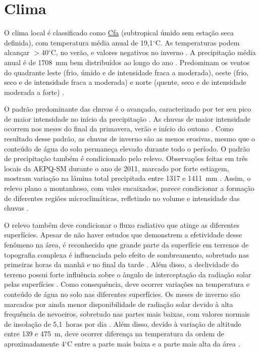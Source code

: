 \section{Clima}

O clima local é classificado como \href{http://pt.wikipedia.org/wiki/Clima_subtropical_\%C3\%BAmido}{Cfa} (subtropical úmido sem estação seca definida), com temperatura média anual de 19,1$^\circ$C. As temperaturas podem alcançar $>$40$^\circ$C, no verão, e valores negativos no inverno \cite{HeldweinEtAl2009}. A precipitação média anual é de 1708~mm bem distribuídos ao longo do ano \cite{Maluf2000}. Predominam os ventos do quadrante leste (frio, úmido e de intensidade fraca a moderada), oeste (frio, seco e de intensidade fraca a moderada) e norte (quente, seco e de intensidade moderada a forte) \cite{HeldweinEtAl2009}.

O padrão predominante das chuvas é o avançado, caracterizado por ter seu pico de maior intensidade no início da precipitação \cite{MehlEtAl2001}. As chuvas de maior intensidade ocorrem nos meses do final da primavera, verão e início do outono \cite{MouraBueno2012}. Como resultado desse padrão, as chuvas de inverno são as menos erosivas, mesmo que o conteúdo de água do solo permaneça elevado durante todo o período. O padrão de precipitação também é condicionado pelo relevo. Observações feitas em três locais da AEPQ-SM durante o ano de 2011, marcado por forte estiagem, mostram variação na lâmina total precipitada entre 1317 e 1411~mm \cite{MouraBueno2012}. Assim, o relevo plano a montanhoso, com vales encaixados, parece condicionar a formação de diferentes regiões microclimáticas, refletindo no volume e intensidade das chuvas \cite{MouraBueno2012}.

O relevo também deve condicionar o fluxo radiativo que atinge as diferentes superfícies. Apesar de não haver estudos que demonstrem a efetividade desse fenômeno na área, é reconhecido que grande parte da superfície em terrenos de topografia complexa é influenciada pelo efeito de sombreamento, sobretudo nas primeiras horas da manhã e no final da tarde \cite{OliphantEtAl2003}. Além disso, a declividade do terreno possui forte influência sobre o ângulo de interceptação da radiação solar pelas superfícies \cite{Birkeland1999}. Como consequência, deve ocorrer variações na temperatura e conteúdo de água no solo nas diferentes superfícies. Os meses de inverno são marcados por ainda menor disponibilidade de radiação solar devido à alta frequência de nevoeiros, sobretudo nas partes mais baixas, com valores normais de insolação de 5,1~horas por dia \cite{HeldweinEtAl2009}. Além disso, devido à variação de altitude entre 139 e 475~m, deve ocorrer diferença na temperatura da ordem de aproximadamente 4$^\circ$C entre a parte mais baixa e a parte mais alta da área \cite{HeldweinEtAl2009}.

